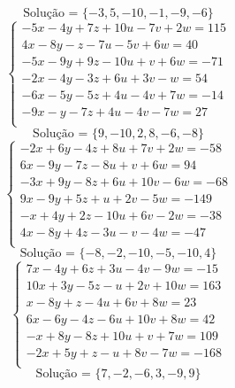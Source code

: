 \documentclass[12pt,oneside,a4paper]{article}
\begin{document}
\begin{equation*}
\text{Solução = }\{-3,5,-10,-1,-9,-6\}
\end{equation*}
\vspace{\baselineskip}
\begin{equation*}
\begin{cases}
-5x-4y+7z+10u-7v+2w=115 \\
4x-8y-z-7u-5v+6w=40 \\
-5x-9y+9z-10u+v+6w=-71 \\
-2x-4y-3z+6u+3v-w=54 \\
-6x-5y-5z+4u-4v+7w=-14 \\
-9x-y-7z+4u-4v-7w=27 \\
\end{cases}
\end{equation*}
\begin{equation*}
\text{Solução = }\{9,-10,2,8,-6,-8\}
\end{equation*}
\vspace{\baselineskip}
\begin{equation*}
\begin{cases}
-2x+6y-4z+8u+7v+2w=-58 \\
6x-9y-7z-8u+v+6w=94 \\
-3x+9y-8z+6u+10v-6w=-68 \\
9x-9y+5z+u+2v-5w=-149 \\
-x+4y+2z-10u+6v-2w=-38 \\
4x-8y+4z-3u-v-4w=-47 \\
\end{cases}
\end{equation*}
\begin{equation*}
\text{Solução = }\{-8,-2,-10,-5,-10,4\}
\end{equation*}
\vspace{\baselineskip}
\begin{equation*}
\begin{cases}
7x-4y+6z+3u-4v-9w=-15 \\
10x+3y-5z-u+2v+10w=163 \\
x-8y+z-4u+6v+8w=23 \\
6x-6y-4z-6u+10v+8w=42 \\
-x+8y-8z+10u+v+7w=109 \\
-2x+5y+z-u+8v-7w=-168 \\
\end{cases}
\end{equation*}
\begin{equation*}
\text{Solução = }\{7,-2,-6,3,-9,9\}
\end{equation*}
\end{document}
